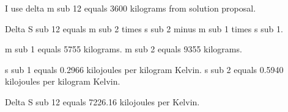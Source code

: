 I use delta m sub 12 equals 3600 kilograms from solution proposal.  

Delta S sub 12 equals m sub 2 times s sub 2 minus m sub 1 times s sub 1.  

m sub 1 equals 5755 kilograms.  
m sub 2 equals 9355 kilograms.  

s sub 1 equals 0.2966 kilojoules per kilogram Kelvin.  
s sub 2 equals 0.5940 kilojoules per kilogram Kelvin.  

Delta S sub 12 equals 7226.16 kilojoules per Kelvin.